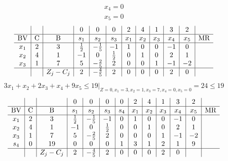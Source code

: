 \documentclass{article}
\begin{document}
\begin{align*}
x_{4}=0\end{align*}
\begin{align*}
x_{5}=0\end{align*}
\begin{align*}
\begin{array}{c|c|c|c|c|c|c|c|c|c|c|c}
 &  &  & 0 & 0 & 0 & 2 & 4 & 1 & 3 & 2 & \\
\hline
\text{BV} & \text{C} & \text{B} & s_{1} & s_{2} & s_{3} & x_{1} & x_{2} & x_{3} & x_{4} & x_{5} & \text{MR} \\
\hline
x_{1} & 2 & 3 & \frac{1}{2} & -\frac{1}{5} & -1 & 1 & 0 & 0 & -1 & 0 \\
x_{2} & 4 & 1 & -1 & 0 & \frac{1}{2} & 0 & 1 & 0 & 2 & 1 \\
x_{3} & 1 & 7 & 5 & -\frac{2}{5} & 2 & 0 & 0 & 1 & -1 & -2 \\
\hline
 &  & Z_j-C_j & 2 & -\frac{4}{5} & 2 & 0 & 0 & 0 & 2 & 0 & \\
\end{array}
\end{align*}
\begin{align*}
\left.3x_{1} + x_{2} + 2x_{3} + x_{4} + 9x_{5}\le19\right|_{Z=0,x_{1}=3,x_{2}=1,x_{3}=7,x_{4}=0,x_{5}=0}=24\le19\end{align*}
\begin{align*}
\begin{array}{c|c|c|c|c|c|c|c|c|c|c|c|c}
 &  &  & 0 & 0 & 0 & 0 & 2 & 4 & 1 & 3 & 2 & \\
\hline
\text{BV} & \text{C} & \text{B} & s_{1} & s_{2} & s_{3} & s_{4} & x_{1} & x_{2} & x_{3} & x_{4} & x_{5} & \text{MR} \\
\hline
x_{1} & 2 & 3 & \frac{1}{2} & -\frac{1}{5} & -1 & 0 & 1 & 0 & 0 & -1 & 0 \\
x_{2} & 4 & 1 & -1 & 0 & \frac{1}{2} & 0 & 0 & 1 & 0 & 2 & 1 \\
x_{3} & 1 & 7 & 5 & -\frac{2}{5} & 2 & 0 & 0 & 0 & 1 & -1 & -2 \\
s_{4} & 0 & 19 & 0 & 0 & 0 & 1 & 3 & 1 & 2 & 1 & 9 \\
\hline
 &  & Z_j-C_j & 2 & -\frac{4}{5} & 2 & 0 & 0 & 0 & 2 & 0 & \\
\end{array}
\end{align*}
\end{document}
